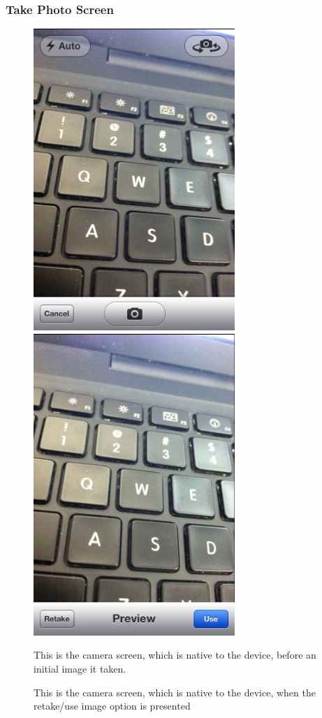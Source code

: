 \newpage
\subsubsection{Take Photo Screen}
\begin{figure}[H!htb]
\includegraphics[width=3in]{ScreenShots111011/TakePhoto.png}
\includegraphics[width=3in]{ScreenShots111011/RetakePhoto.png}
\caption{This is the camera screen, which is native to the device, before an initial image it taken.}
\caption{This is the camera screen, which is native to the device, when the retake/use image option is presented}
\end{figure}

